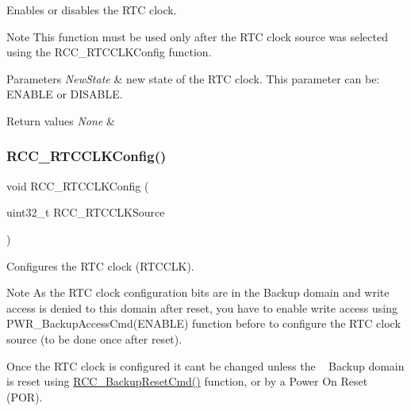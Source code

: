Enables or disables the R\+TC clock. 

\begin{DoxyNote}{Note}
This function must be used only after the R\+TC clock source was selected using the R\+C\+C\+\_\+\+R\+T\+C\+C\+L\+K\+Config function. 
\end{DoxyNote}

\begin{DoxyParams}{Parameters}
{\em New\+State} & new state of the R\+TC clock. This parameter can be\+: E\+N\+A\+B\+LE or D\+I\+S\+A\+B\+LE. \\
\hline
\end{DoxyParams}

\begin{DoxyRetVals}{Return values}
{\em None} & \\
\hline
\end{DoxyRetVals}
\mbox{\label{group___r_c_c_ga1473d8a5a020642966359611c44181b0}} 
\subsubsection{\texorpdfstring{R\+C\+C\+\_\+\+R\+T\+C\+C\+L\+K\+Config()}{RCC\_RTCCLKConfig()}}
{\footnotesize\ttfamily void R\+C\+C\+\_\+\+R\+T\+C\+C\+L\+K\+Config (\begin{DoxyParamCaption}\item[{uint32\+\_\+t}]{R\+C\+C\+\_\+\+R\+T\+C\+C\+L\+K\+Source }\end{DoxyParamCaption})}



Configures the R\+TC clock (R\+T\+C\+C\+LK). 

\begin{DoxyNote}{Note}
As the R\+TC clock configuration bits are in the Backup domain and write access is denied to this domain after reset, you have to enable write access using P\+W\+R\+\_\+\+Backup\+Access\+Cmd(\+E\+N\+A\+B\+L\+E) function before to configure the R\+TC clock source (to be done once after reset). ~\newline


Once the R\+TC clock is configured it can\textquotesingle{}t be changed unless the ~\newline
 Backup domain is reset using \mbox{\hyperlink{group___r_c_c___group3_ga636c3b72f35391e67f12a551b15fa54a}{R\+C\+C\+\_\+\+Backup\+Reset\+Cmd()}} function, or by a Power On Reset (P\+OR).
\end{DoxyNote}

